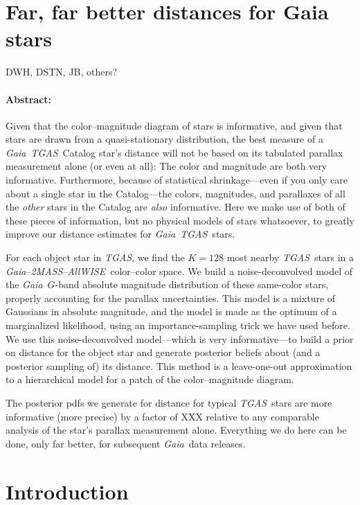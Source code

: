 \documentclass[12pt]{article}
\newcommand{\project}[1]{\textsl{#1}}
\newcommand{\acronym}[1]{\small{#1}}
\newcommand{\gaia}{\project{Gaia}}
\newcommand{\tgas}{\project{\acronym{TGAS}}}
\newcommand{\twomass}{\project{\acronym{2MASS}}}
\newcommand{\wise}{\project{All\acronym{WISE}}}
\begin{document}
\section*{Far, far better distances for Gaia stars}

\noindent
DWH, DSTN, JB, others?

\paragraph{Abstract:}
Given that the color--magnitude diagram of stars is informative, and
given that stars are drawn from a quasi-stationary distribution, the
best measure of a \gaia\ \tgas\ Catalog star's distance will not be based on
its tabulated parallax measurement alone (or even at all):
The color and magnitude are both very informative.
Furthermore, because of statistical shrinkage---even if you
only care about a single star in the Catalog---the colors, magnitudes,
and parallaxes of all the \emph{other} stars in the Catalog are \emph{also}
informative.
Here we make use of both of these pieces of information, but no
physical models of stars whatsoever, to greatly improve our distance
estimates for \gaia\ \tgas\ stars.

For each object star in \tgas, we find the $K=128$ most nearby \tgas\ stars
in a \gaia--\twomass--\wise\ color--color space.
We build a noise-deconvolved model of the \gaia\ $G$-band absolute
magnitude distribution of these same-color stars, properly accounting
for the parallax uncertainties.
This model is a mixture of Gaussians in absolute magnitude, and the
model is made as the optimum of a marginalized likelihood, using an
importance-sampling trick we have used before.
We use this noise-deconvolved model---which is very informative---to
build a prior on distance for the object star and generate posterior
beliefs about (and a posterior sampling of) its distance.
This method is a leave-one-out approximation to a hierarchical model for
a patch of the color--magnitude diagram.

The posterior pdfs we generate for distance for typical \tgas\ stars
are more informative (more precise) by a factor of XXX relative to any
comparable analysis of the star's parallax measurement alone.
Everything we do here can be done, only far better, for subsequent
\gaia\ data releases.

\section{Introduction}
\end{document}
